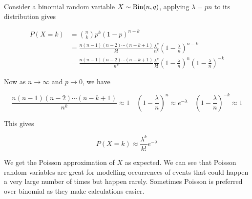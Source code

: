 Consider a binomial random variable $X\sim\operatorname{Bin}(n,q)$, applying $\lambda=pn$ to its distribution gives

\begin{align}
	P(X = k) &= {n \choose k}p^k(1-p)^{n-k} \\
	&=\frac{n(n-1)(n-2)\cdots(n-k+1)}{k!}\frac{\lambda^k}{n^k}\left(1-\frac{\lambda}{n}\right)^{n-k} \\
	&=\frac{n(n-1)(n-2)\cdots(n-k+1)}{n^k}\frac{\lambda^k}{k!}\left(1-\frac{\lambda}{n}\right)^n\left(1-\frac{\lambda}{n}\right)^{-k}
\end{align}

Now as $n \to \infty$ and $p \to 0$, we have

$$\frac{n(n-1)(n-2)\cdots(n-k+1)}{n^k} \approx 1 \quad \left(1-\frac{\lambda}{n}\right)^n \approx e^{-\lambda} \quad \left(1-\frac{\lambda}{n}\right)^{-k} \approx 1$$

This gives

$$P(X = k) \approx \frac{\lambda^k}{k!}e^{-\lambda}$$

We get the Poisson approximation of $X$ as expected. We can see that Poisson random variables are great for modelling occurrences of events that could happen a very large number of times but happen rarely. Sometimes Poisson is preferred over binomial as they make calculations easier.

